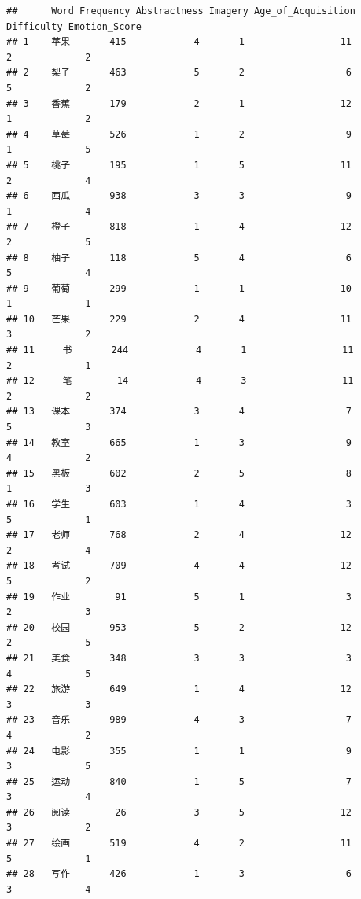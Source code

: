 \documentclass[]{book}
\begin{document}
\begin{verbatim}
##      Word Frequency Abstractness Imagery Age_of_Acquisition Difficulty Emotion_Score
## 1    苹果       415            4       1                 11          2             2
## 2    梨子       463            5       2                  6          5             2
## 3    香蕉       179            2       1                 12          1             2
## 4    草莓       526            1       2                  9          1             5
## 5    桃子       195            1       5                 11          2             4
## 6    西瓜       938            3       3                  9          1             4
## 7    橙子       818            1       4                 12          2             5
## 8    柚子       118            5       4                  6          5             4
## 9    葡萄       299            1       1                 10          1             1
## 10   芒果       229            2       4                 11          3             2
## 11     书       244            4       1                 11          2             1
## 12     笔        14            4       3                 11          2             2
## 13   课本       374            3       4                  7          5             3
## 14   教室       665            1       3                  9          4             2
## 15   黑板       602            2       5                  8          1             3
## 16   学生       603            1       4                  3          5             1
## 17   老师       768            2       4                 12          2             4
## 18   考试       709            4       4                 12          5             2
## 19   作业        91            5       1                  3          2             3
## 20   校园       953            5       2                 12          2             5
## 21   美食       348            3       3                  3          4             5
## 22   旅游       649            1       4                 12          3             3
## 23   音乐       989            4       3                  7          4             2
## 24   电影       355            1       1                  9          3             5
## 25   运动       840            1       5                  7          3             4
## 26   阅读        26            3       5                 12          3             2
## 27   绘画       519            4       2                 11          5             1
## 28   写作       426            1       3                  6          3             4

\end{verbatim}
\end{document}
